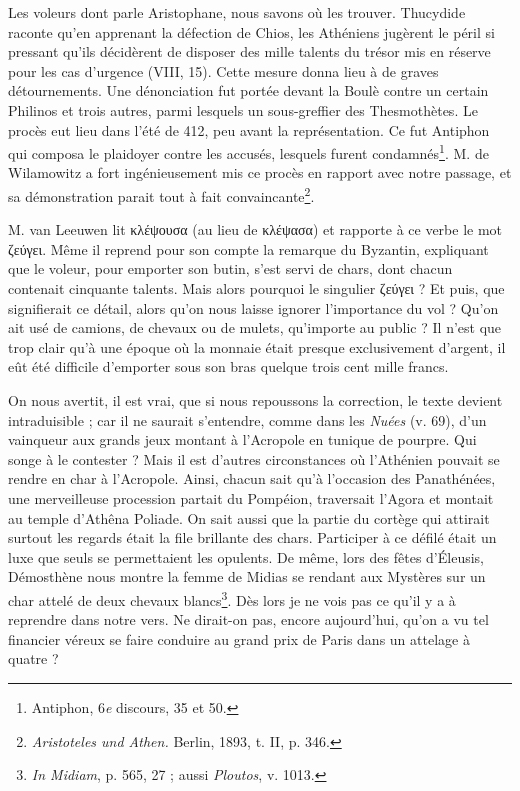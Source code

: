 \documentclass{book}%
\newcommand{\italique}[1]{\textit{#1}}%
\newcommand{\nieme}[1]{#1\italique{e}}%
\newcommand{\note}[1]{\footnote{#1}}
\begin{document}
Les voleurs dont parle Aristophane, nous savons où les trouver. Thucydide raconte qu'en apprenant la défection de Chios, les Athéniens jugèrent le péril si pressant qu'ils décidèrent de disposer des mille talents du trésor mis en réserve pour les cas d'urgence (VIII, 15). 
Cette mesure donna lieu à de graves détournements. Une dénonciation fut portée devant la Boulè contre un certain Philinos et trois autres, parmi lesquels un sous-greffier des Thesmothètes. Le procès eut lieu dans l'été de 412, peu avant la représentation. Ce fut Antiphon qui composa le plaidoyer contre les accusés, lesquels furent condamnés\note{Antiphon, \nieme{6} discours, 35 et 50.}. M. de Wilamowitz a fort ingénieusement mis ce procès en rapport avec notre passage, et sa démonstration parait tout à fait convaincante\note{\italique{Aristoteles und Athen.} Berlin, 1893, t. II, p. 346.}. 

M. van Leeuwen lit κλέψουσα (au lieu de κλέψασα) et rapporte à ce verbe le mot ζεύγει. Même il reprend pour son compte la remarque du Byzantin, expliquant que le voleur, pour emporter son butin, s'est servi de chars, dont chacun contenait cinquante talents. Mais alors pourquoi le singulier ζεύγει ? 
Et puis, que signifierait ce détail, alors qu'on nous laisse ignorer l'importance du vol ? Qu'on ait usé de camions, de chevaux ou de mulets, qu'importe au public ? Il n'est que trop clair qu'à une époque où la monnaie était presque exclusivement d'argent, il eût été difficile d'emporter sous son bras quelque trois cent mille francs. 

On nous avertit, il est vrai, que si nous repoussons la correction, le texte devient intraduisible ; car il ne saurait s'entendre, comme dans les \italique{Nuées} (v. 69), d'un vainqueur aux grands jeux montant à l'Acropole en tunique de pourpre. Qui songe à le contester ? Mais il est d'autres circonstances où l'Athénien pouvait se rendre en char à l'Acropole. 
Ainsi, chacun sait qu'à l'occasion des Panathénées, une merveilleuse procession partait du Pompéion, traversait l'Agora et montait au temple d'Athêna Poliade. 
On sait aussi que la partie du cortège qui attirait surtout les regards était la file brillante des chars. Participer à ce défilé était un luxe que seuls se permettaient les opulents. 
De même, lors des fêtes d'Éleusis, Démosthène nous montre la femme de Midias se rendant aux Mystères sur un char attelé de deux chevaux blancs\note{\italique{In Midiam}, p. 565, 27 ; aussi \italique{Ploutos}, v. 1013.}. Dès lors je ne vois pas ce qu'il y a à reprendre dans notre vers. Ne dirait-on pas, encore aujourd'hui, qu'on a vu tel financier véreux se faire conduire au grand prix de Paris dans un attelage à quatre ?
\end{document}
